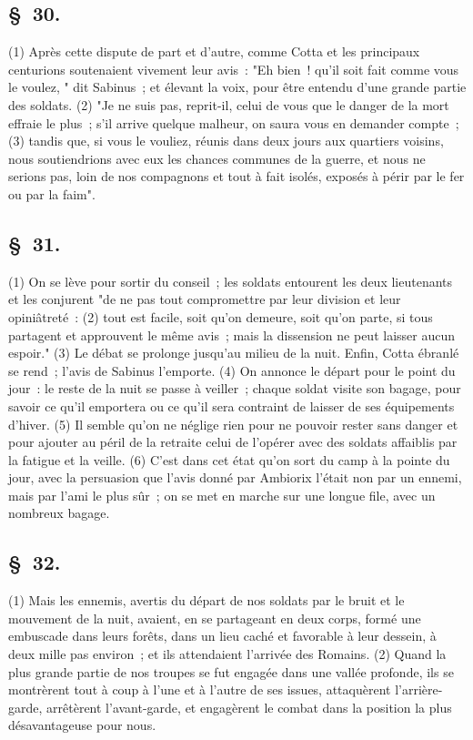 \documentclass[french,twoside]{book} %
\begin{document}
\subsection[{§ 30.}]{ \textsc{§ 30.} }
\noindent (1) Après cette dispute de part et d’autre, comme Cotta et les principaux centurions soutenaient vivement leur avis : "Eh bien ! qu’il soit fait comme vous le voulez, " dit Sabinus ; et élevant la voix, pour être entendu d’une grande partie des soldats. (2) "Je ne suis pas, reprit-il, celui de vous que le danger de la mort effraie le plus ; s’il arrive quelque malheur, on saura vous en demander compte ; (3) tandis que, si vous le vouliez, réunis dans deux jours aux quartiers voisins, nous soutiendrions avec eux les chances communes de la guerre, et nous ne serions pas, loin de nos compagnons et tout à fait isolés, exposés à périr par le fer ou par la faim".
\subsection[{§ 31.}]{ \textsc{§ 31.} }
\noindent (1) On se lève pour sortir du conseil ; les soldats entourent les deux lieutenants et les conjurent "de ne pas tout compromettre par leur division et leur opiniâtreté : (2) tout est facile, soit qu’on demeure, soit qu’on parte, si tous partagent et approuvent le même avis ; mais la dissension ne peut laisser aucun espoir." (3) Le débat se prolonge jusqu’au milieu de la nuit. Enfin, Cotta ébranlé se rend ; l’avis de Sabinus l’emporte. (4) On annonce le départ pour le point du jour : le reste de la nuit se passe à veiller ; chaque soldat visite son bagage, pour savoir ce qu’il emportera ou ce qu’il sera contraint de laisser de ses équipements d’hiver. (5) Il semble qu’on ne néglige rien pour ne pouvoir rester sans danger et pour ajouter au péril de la retraite celui de l’opérer avec des soldats affaiblis par la fatigue et la veille. (6) C'est dans cet état qu’on sort du camp à la pointe du jour, avec la persuasion que l’avis donné par Ambiorix l’était non par un ennemi, mais par l’ami le plus sûr ; on se met en marche sur une longue file, avec un nombreux bagage.
\subsection[{§ 32.}]{ \textsc{§ 32.} }
\noindent (1) Mais les ennemis, avertis du départ de nos soldats par le bruit et le mouvement de la nuit, avaient, en se partageant en deux corps, formé une embuscade dans leurs forêts, dans un lieu caché et favorable à leur dessein, à deux mille pas environ ; et ils attendaient l’arrivée des Romains. (2) Quand la plus grande partie de nos troupes se fut engagée dans une vallée profonde, ils se montrèrent tout à coup à l’une et à l’autre de ses issues, attaquèrent l’arrière-garde, arrêtèrent l’avant-garde, et engagèrent le combat dans la position la plus désavantageuse pour nous.
\end{document}
